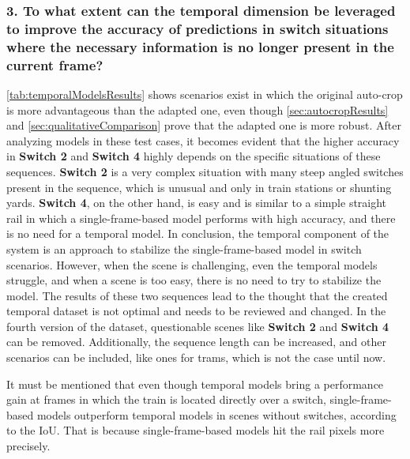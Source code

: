 \subsubsection{3. To what extent can the temporal dimension be leveraged to improve the accuracy of predictions in switch situations where the necessary information is no longer present in the current frame?}

\autoref{tab:temporalModelsResults} shows scenarios exist in which the original auto-crop is more advantageous than the adapted one, even though \autoref{sec:autocropResults} and \autoref{sec:qualitativeComparison} prove that the adapted one is more robust.
After analyzing models in these test cases, it becomes evident that the higher accuracy in \textbf{Switch 2} and \textbf{Switch 4} highly depends on the specific situations of these sequences.
\textbf{Switch 2} is a very complex situation with many steep angled switches present in the sequence, which is unusual and only in train stations or shunting yards.
\textbf{Switch 4}, on the other hand, is easy and is similar to a simple straight rail in which a single-frame-based model performs with high accuracy, and there is no need for a temporal model.
In conclusion, the temporal component of the system is an approach to stabilize the single-frame-based model in switch scenarios.
However, when the scene is challenging, even the temporal models struggle, and when a scene is too easy, there is no need to try to stabilize the model.
The results of these two sequences lead to the thought that the created temporal dataset is not optimal and needs to be reviewed and changed.
In the fourth version of the dataset, questionable scenes like \textbf{Switch 2} and \textbf{Switch 4} can be removed.
Additionally, the sequence length can be increased, and other scenarios can be included, like ones for trams, which is not the case until now.

It must be mentioned that even though temporal models bring a performance gain at frames in which the train is located directly over a switch, single-frame-based models outperform temporal models in scenes without switches, according to the \ac{IoU}.
That is because single-frame-based models hit the rail pixels more precisely.